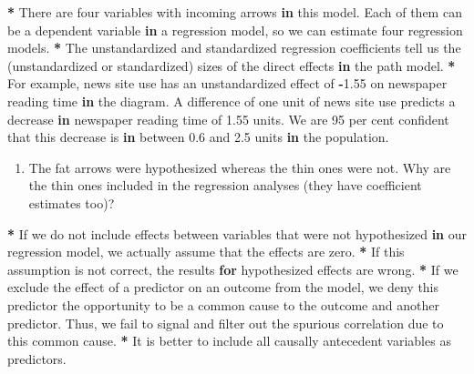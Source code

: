 \documentclass[a4paper]{book}
\newenvironment{Shaded}{\begin{snugshade}}{\end{snugshade}}
\newcommand{\DecValTok}[1]{\textcolor[rgb]{0.00,0.00,0.00}{#1}}
\newcommand{\FloatTok}[1]{\textcolor[rgb]{0.00,0.00,0.00}{#1}}
\newcommand{\StringTok}[1]{\textcolor[rgb]{0.00,0.00,0.00}{#1}}
\newcommand{\ControlFlowTok}[1]{\textcolor[rgb]{0.00,0.00,0.00}{\textbf{#1}}}
\newcommand{\OperatorTok}[1]{\textcolor[rgb]{0.00,0.00,0.00}{\textbf{#1}}}
\newcommand{\NormalTok}[1]{#1}
\providecommand{\tightlist}{%
  \setlength{\itemsep}{0pt}\setlength{\parskip}{0pt}}
\theoremstyle{definition}
\theoremstyle{definition}
\theoremstyle{definition}
\theoremstyle{remark}
\begin{document}
\begin{Shaded}
\begin{Highlighting}[]
\OperatorTok{*}\StringTok{ }\NormalTok{There are four variables with incoming arrows }\ControlFlowTok{in}\NormalTok{ this model. Each of them can}
\NormalTok{be a dependent variable }\ControlFlowTok{in}\NormalTok{ a regression model, so we can estimate four}
\NormalTok{regression models.}
\OperatorTok{*}\StringTok{ }\NormalTok{The unstandardized and standardized regression coefficients tell us the}
\NormalTok{(unstandardized or standardized) sizes of the direct effects }\ControlFlowTok{in}\NormalTok{ the path}
\NormalTok{model.}
\OperatorTok{*}\StringTok{ }\NormalTok{For example, news site use has an unstandardized effect of }\OperatorTok{-}\FloatTok{1.55}\NormalTok{ on}
\NormalTok{newspaper reading time }\ControlFlowTok{in}\NormalTok{ the diagram. A difference of one unit of news site}
\NormalTok{use predicts a decrease }\ControlFlowTok{in}\NormalTok{ newspaper reading time of }\FloatTok{1.55}\NormalTok{ units. We are }\DecValTok{95}
\NormalTok{per cent confident that this decrease is }\ControlFlowTok{in}\NormalTok{ between }\FloatTok{0.6}\NormalTok{ and }\FloatTok{2.5}\NormalTok{ units }\ControlFlowTok{in}\NormalTok{ the}
\NormalTok{population.}
\end{Highlighting}
\end{Shaded}

\begin{enumerate}
\def\labelenumi{\arabic{enumi}.}
\setcounter{enumi}{1}
\tightlist
\item
  The fat arrows were hypothesized whereas the thin ones were not. Why
  are the thin ones included in the regression analyses (they have
  coefficient estimates too)?
\end{enumerate}

\begin{Shaded}
\begin{Highlighting}[]
\OperatorTok{*}\StringTok{ }\NormalTok{If we do not include effects between variables that were not hypothesized }\ControlFlowTok{in}
\NormalTok{our regression model, we actually assume that the effects are zero.}
\OperatorTok{*}\StringTok{ }\NormalTok{If this assumption is not correct, the results }\ControlFlowTok{for}\NormalTok{ hypothesized effects are}
\NormalTok{wrong.}
\OperatorTok{*}\StringTok{ }\NormalTok{If we exclude the effect of a predictor on an outcome from the model, we}
\NormalTok{deny this predictor the opportunity to be a common cause to the outcome and}
\NormalTok{another predictor. Thus, we fail to signal and filter out the spurious}
\NormalTok{correlation due to this common cause.}
\OperatorTok{*}\StringTok{ }\NormalTok{It is better to include all causally antecedent variables as predictors.}
\end{Highlighting}
\end{Shaded}
\end{document}
